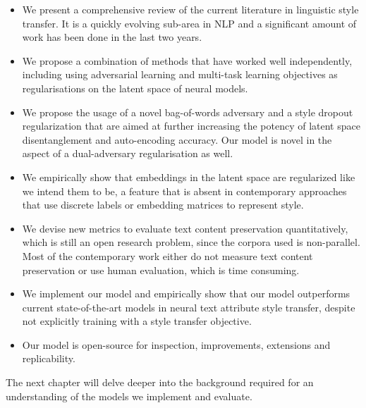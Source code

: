 \begin{itemize}
	\item We present a comprehensive review of the current literature in linguistic style transfer. It is a quickly evolving sub-area in NLP and a significant amount of work has been done in the last two years.
	\item We propose a combination of methods that have worked well independently, including using adversarial learning and multi-task learning objectives as regularisations on the latent space of neural models.
	\item We propose the usage of a novel bag-of-words adversary and a style dropout regularization that are aimed at further increasing the potency of latent space disentanglement and auto-encoding accuracy. Our model is novel in the aspect of a dual-adversary regularisation as well.
	\item We empirically show that embeddings in the latent space are regularized like we intend them to be, a feature that is absent in contemporary approaches that use discrete labels or embedding matrices to represent style.
	\item We devise new metrics to evaluate text content preservation quantitatively, which is still an open research problem, since the corpora used is non-parallel. Most of the contemporary work either do not measure text content preservation or use human evaluation, which is time consuming.
	\item We implement our model and empirically show that our model outperforms current state-of-the-art models in neural text attribute style transfer, despite not explicitly training with a style transfer objective.
	\item Our model is open-source for inspection, improvements, extensions and replicability.
\end{itemize}

The next chapter will delve deeper into the background required for an understanding of the models we implement and evaluate.
